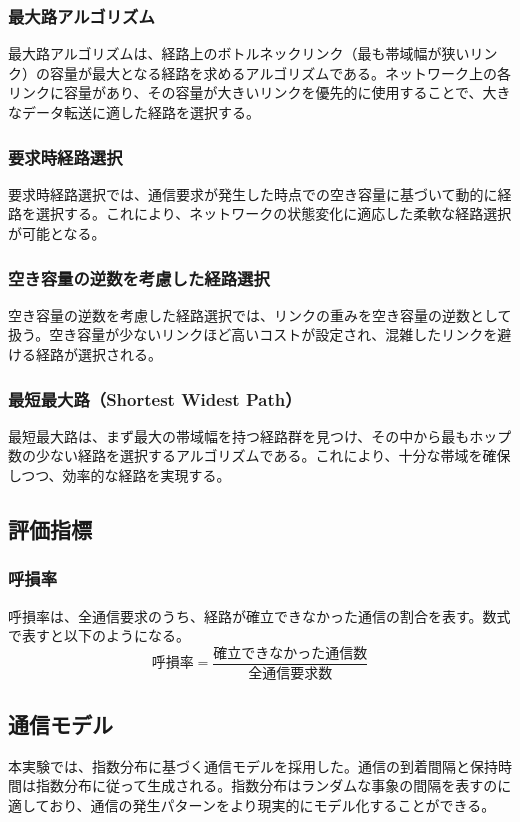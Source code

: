 \documentclass[a4paper,11pt]{jsarticle}
\begin{document}
\subsubsection{最大路アルゴリズム}
最大路アルゴリズムは、経路上のボトルネックリンク（最も帯域幅が狭いリンク）の容量が最大となる経路を求めるアルゴリズムである。ネットワーク上の各リンクに容量があり、その容量が大きいリンクを優先的に使用することで、大きなデータ転送に適した経路を選択する。

\subsubsection{要求時経路選択}
要求時経路選択では、通信要求が発生した時点での空き容量に基づいて動的に経路を選択する。これにより、ネットワークの状態変化に適応した柔軟な経路選択が可能となる。

\subsubsection{空き容量の逆数を考慮した経路選択}
空き容量の逆数を考慮した経路選択では、リンクの重みを空き容量の逆数として扱う。空き容量が少ないリンクほど高いコストが設定され、混雑したリンクを避ける経路が選択される。

\subsubsection{最短最大路（Shortest Widest Path）}
最短最大路は、まず最大の帯域幅を持つ経路群を見つけ、その中から最もホップ数の少ない経路を選択するアルゴリズムである。これにより、十分な帯域を確保しつつ、効率的な経路を実現する。

\subsection{評価指標}

\subsubsection{呼損率}
呼損率は、全通信要求のうち、経路が確立できなかった通信の割合を表す。数式で表すと以下のようになる。
\begin{equation}
呼損率 = \frac{確立できなかった通信数}{全通信要求数}
\end{equation}

\subsection{通信モデル}
本実験では、指数分布に基づく通信モデルを採用した。通信の到着間隔と保持時間は指数分布に従って生成される。指数分布はランダムな事象の間隔を表すのに適しており、通信の発生パターンをより現実的にモデル化することができる。
\end{document}
